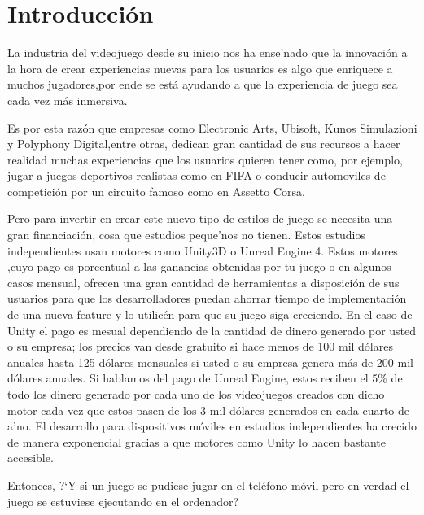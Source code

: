 \section{Introducci\'on}
\label{cap1:sec:introduccion}

La industria del videojuego desde su inicio nos ha ense'nado que la innovaci\'on
 a la hora de crear experiencias nuevas para los usuarios es algo que enriquece a muchos jugadores,por ende se est\'a ayudando a que
la experiencia de juego sea cada vez m\'as inmersiva.

Es por esta raz\'on que empresas como Electronic Arts, Ubisoft, Kunos Simulazioni y Polyphony Digital,entre otras, dedican gran cantidad de sus recursos
a hacer realidad muchas experiencias que los usuarios quieren tener como, por ejemplo,
 jugar a juegos deportivos realistas como en FIFA o conducir automoviles de competici\'on por un circuito famoso como en Assetto Corsa.

Pero para invertir en crear este nuevo tipo de estilos de juego se necesita una gran financiaci\'on,
 cosa que estudios peque'nos no tienen.  Estos estudios independientes usan motores como Unity3D o Unreal Engine 4.
 Estos motores ,cuyo pago es porcentual a las ganancias obtenidas por tu juego o en algunos casos mensual, ofrecen una gran cantidad de herramientas a disposici\'on 
de sus usuarios para que los desarrolladores puedan ahorrar tiempo de implementaci\'on de una nueva feature y lo utilic\'en para que su juego siga creciendo. En el caso de Unity el pago es mesual dependiendo de la cantidad de dinero generado por usted o su empresa; los precios van desde gratuito si hace menos de 100 mil d\'olares anuales hasta 125 d\'olares mensuales si usted o su empresa genera m\'as de 200 mil d\'olares anuales. Si hablamos del pago de Unreal Engine, estos reciben el 5\% de todo los dinero generado por cada uno de los videojuegos creados con dicho motor cada vez que estos pasen de los 3 mil d\'olares generados en cada cuarto de a'no.  
El desarrollo para dispositivos m\'oviles en estudios independientes ha crecido de manera exponencial gracias a que motores como Unity lo hacen bastante accesible. 


Entonces,
 ?`Y si un juego se pudiese jugar en el tel\'efono m\'ovil pero en verdad el juego se estuviese ejecutando en el ordenador?


